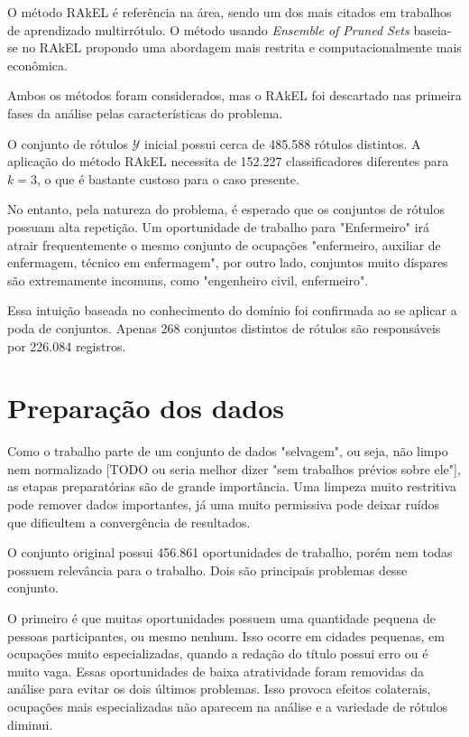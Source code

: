 \documentclass[runningheads,a4paper]{llncs}
\begin{document}
O método RAkEL \cite{Tsoumakas2007-wm} é referência na área, sendo um dos mais citados em trabalhos de aprendizado multirrótulo. O método usando \textit{Ensemble of Pruned Sets} baseia-se no RAkEL propondo uma abordagem mais restrita e computacionalmente mais econômica.

Ambos os métodos foram considerados, mas o RAkEL foi descartado nas primeira fases da análise pelas características do problema.

O conjunto de rótulos $\mathcal{Y}$ inicial possui cerca de 485.588 rótulos distintos. A aplicação do método RAkEL \cite{Tsoumakas2007-wm} necessita de 152.227 classificadores diferentes para $k=3$, o que é bastante custoso para o caso presente.

No entanto, pela natureza do problema, é esperado que os conjuntos de rótulos possuam alta repetição. Um oportunidade de trabalho para "Enfermeiro" irá atrair frequentemente o mesmo conjunto de ocupações "enfermeiro, auxiliar de enfermagem, técnico em enfermagem", por outro lado, conjuntos muito díspares são extremamente incomuns, como "engenheiro civil, enfermeiro".

Essa intuição baseada no conhecimento do domínio foi confirmada ao se aplicar a poda de conjuntos. Apenas 268 conjuntos distintos de rótulos são responsáveis por 226.084 registros.

\section{Preparação dos dados} \label{sec:preparacao}

Como o trabalho parte de um conjunto de dados "selvagem", ou seja, não limpo nem normalizado [TODO ou seria melhor dizer "sem trabalhos prévios sobre ele"], as etapas preparatórias são de grande importância. Uma limpeza muito restritiva pode remover dados importantes, já uma muito permissiva pode deixar ruídos que dificultem a convergência de resultados.

O conjunto original possui 456.861 oportunidades de trabalho, porém nem todas possuem relevância para o trabalho. Dois são principais problemas desse conjunto.

O primeiro é que muitas oportunidades possuem uma quantidade pequena de pessoas participantes, ou mesmo nenhum. Isso ocorre em cidades pequenas, em ocupações muito especializadas, quando a redação do título possui erro ou é muito vaga. Essas oportunidades de baixa atratividade foram removidas da análise para evitar os dois últimos problemas. Isso provoca efeitos colaterais, ocupações mais especializadas não aparecem na análise e a variedade de rótulos diminui.
\end{document}
